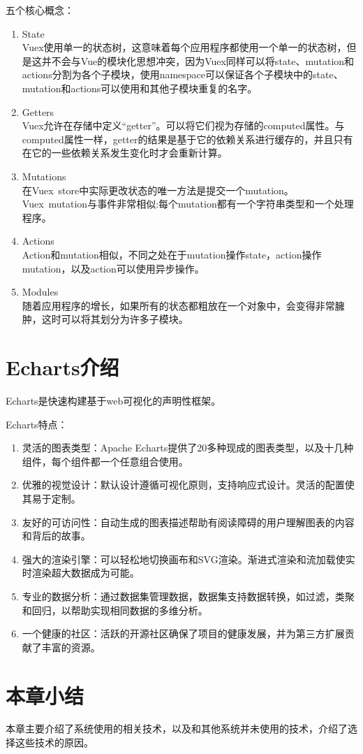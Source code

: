 五个核心概念：

\begin{enumerate}
  \item State\\
        Vuex使用单一的状态树，这意味着每个应用程序都使用一个单一的状态树，但是这并不会与Vue的模块化思想冲突，因为Vuex同样可以将state、mutation和actions分割为各个子模块，使用namespace可以保证各个子模块中的state、mutation和actions可以使用和其他子模块重复的名字。
  \item Getters\\
        Vuex允许在存储中定义“getter”。可以将它们视为存储的computed属性。与computed属性一样，getter的结果是基于它的依赖关系进行缓存的，并且只有在它的一些依赖关系发生变化时才会重新计算。
  \item Mutations\\
        在Vuex~store中实际更改状态的唯一方法是提交一个mutation。Vuex~mutation与事件非常相似:每个mutation都有一个字符串类型和一个处理程序。
  \item Actions\\
        Action和mutation相似，不同之处在于mutation操作state，action操作mutation，以及action可以使用异步操作。
  \item Modules\\
        随着应用程序的增长，如果所有的状态都粗放在一个对象中，会变得非常臃肿，这时可以将其划分为许多子模块。
\end{enumerate}

\section{Echarts介绍}

Echarts是快速构建基于web可视化的声明性框架。

Echarts特点：
\begin{enumerate}
  \item 灵活的图表类型：Apache Echarts提供了20多种现成的图表类型，以及十几种组件，每个组件都一个任意组合使用。
  \item 优雅的视觉设计：默认设计遵循可视化原则，支持响应式设计。灵活的配置使其易于定制。
  \item 友好的可访问性：自动生成的图表描述帮助有阅读障碍的用户理解图表的内容和背后的故事。
  \item 强大的渲染引擎：可以轻松地切换画布和SVG渲染。渐进式渲染和流加载使实时渲染超大数据成为可能。
  \item 专业的数据分析：通过数据集管理数据，数据集支持数据转换，如过滤，类聚和回归，以帮助实现相同数据的多维分析。
  \item 一个健康的社区：活跃的开源社区确保了项目的健康发展，并为第三方扩展贡献了丰富的资源。
\end{enumerate}

\section{本章小结}

本章主要介绍了系统使用的相关技术，以及和其他系统并未使用的技术，介绍了选择这些技术的原因。